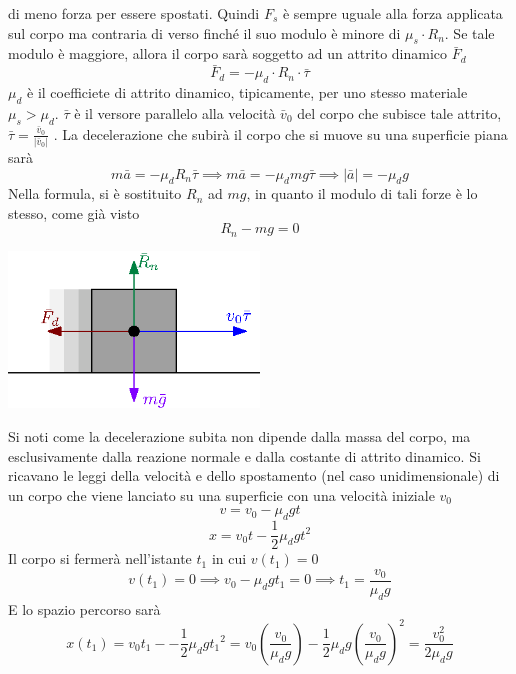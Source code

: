 \documentclass[10pt, letterpaper]{report}
\begin{document}
 di meno forza per essere spostati.\acc 
 Quindi $F_s$ è sempre uguale alla forza applicata sul corpo ma contraria di verso finché il suo modulo è minore 
 di $\mu_s\cdot R_n$. Se tale modulo è maggiore, allora il corpo sarà soggetto ad un 
 attrito dinamico $\bar F_d$
 $$ \bar F_d = -\mu_d\cdot R_n\cdot \bar \tau$$
$\mu_d$ è il coefficiete di attrito dinamico, tipicamente, per uno stesso materiale $\mu_s>\mu_d$. $\bar \tau$ è il 
versore parallelo  alla velocità $\bar v_0$ del corpo che subisce tale attrito, $\bar \tau = \frac{\bar v_0}{|\bar v_0|}$ . La decelerazione che subirà 
il corpo che si muove su una superficie piana sarà
$$ m\bar a = -\mu_dR_n\bar \tau\implies m\bar a = -\mu_dmg\bar \tau \implies |\bar a| = -\mu_d g$$
Nella formula, si è sostituito $R_n$ ad $mg$, in quanto il modulo di tali forze è lo stesso, come già visto 
$$ R_n-mg=0$$
\begin{center}
    \includegraphics[width=0.5\textwidth]{images/attritoDinamico.eps}
\end{center}
Si noti come la decelerazione subita non dipende dalla massa del corpo, ma esclusivamente dalla reazione 
normale e dalla costante di attrito dinamico. Si ricavano le leggi della velocità e dello spostamento (nel caso 
unidimensionale) di un corpo che viene lanciato su una superficie con una velocità iniziale $v_0$
$$ v=v_0-\mu_dgt$$ 
$$ x=v_0t-\frac{1}{2}\mu_dgt^2$$
Il corpo si fermerà nell'istante $t_1$ in cui $v(t_1)=0$
$$ v(t_1)=0\implies v_0-\mu_dgt_1=0\implies t_1=\frac{v_0}{\mu_dg}$$
E lo spazio percorso sarà 
$$ x(t_1)=v_0t_1--\frac{1}{2}\mu_dg{t_1}^2=
v_0(\frac{v_0}{\mu_dg})-\frac{1}{2}\mu_dg{(\frac{v_0}{\mu_dg})}^2=\frac{v_0^2}{2\mu_dg}
$$
\end{document}

